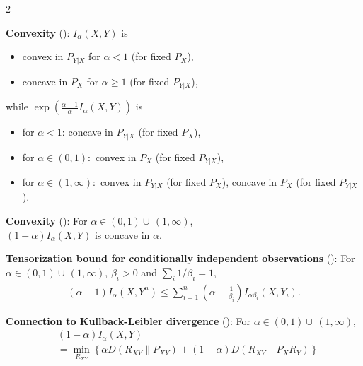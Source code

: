 \documentclass{article}
\numberwithin{theorem}{section}
\numberwithin{example}{section}
\numberwithin{remark}{section}
\numberwithin{definition}{section}
\begin{document}
\begin{table}[tbp]
{\begin{minipage}[t][60\baselineskip][t]{\textwidth}
\begin{multicols}{2}
    \begin{samepage}
      \textbf{Convexity} (): $I_\alpha(X,Y)$ is
      \begin{itemize}
      \item convex in $P_{Y|X}$ for $\alpha <1$ (for fixed $P_X$),
      \item concave in $P_X$ for $\alpha \geq 1$ (for fixed $P_{Y|X}$),
      \end{itemize}
     \end{samepage}
 

    \begin{samepage}
    \hspace{1em} while $\exp\left(\frac{\alpha-1}{\alpha}I_\alpha(X,Y)\right)$ is
      \begin{itemize}
      \item for $\alpha<1 $: concave in $P_{Y|X}$ (for fixed $P_X$),
      \item for $\alpha \in (0,1):$  convex in $P_X$ (for fixed $P_{Y|X}$),
      \item for $\alpha \in (1,\infty):$
convex in $P_{Y|X}$ (for fixed $P_X$),
concave in $P_X$ (for fixed $P_{Y|X}$).
      \end{itemize}
    \end{samepage}

      \textbf{Convexity
     } (): For $\alpha \in (0,1) \cup\, (1,\infty)$,\\ $(1-\alpha)I_\alpha(X,Y)$ is concave in $\alpha.$
      \vspace{\belowdisplayskip}
      
      \textbf{Tensorization bound for conditionally independent observations }(): For $\alpha \in (0,1) \cup\, (1,\infty)$, $\beta_i>0$ and $\sum_i 1/\beta_i=1,$
    \begin{align}
        (\alpha-1) I_\alpha(X, Y^n) \leq  \sum_{i=1}^n \left(\alpha - \frac{1}{\beta_i} \right) I_{\alpha \beta_i} (X,Y_i). \nonumber       
    \end{align}

      \textbf{Connection to Kullback-Leibler divergence }(): For $\alpha \in (0,1) \cup\, (1,\infty)$,
\begin{align*}
   &(1-\alpha)I_\alpha(X,Y)\\ &= \min_{R_{XY}} \left\{ \alpha D(R_{XY}\|P_{XY}) + (1-\alpha) D(R_{XY}\|P_{X}R_Y) \right\}
\end{align*}
      \vspace{\belowdisplayskip}


\end{multicols}
\end{minipage}}
\end{table}
\end{document}
